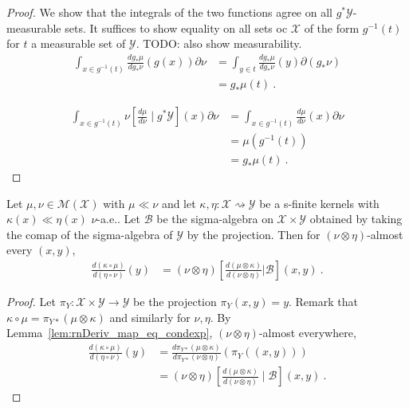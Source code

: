 \begin{proof}%
\uses{}
We show that the integrals of the two functions agree on all $g^* \mathcal Y$-measurable sets. It suffices to show equality on all sets oc $\mathcal X$ of the form $g^{-1}(t)$ for $t$ a measurable set of $\mathcal Y$.
TODO: also show measurability.
\begin{align*}
\int_{x \in g^{-1}(t)}\frac{d g_*\mu}{d g_*\nu}(g(x)) \partial\nu
&= \int_{y \in t}\frac{d g_*\mu}{d g_*\nu}(y) \partial(g_*\nu)
\\
&= g_*\mu (t)
\: .
\end{align*}

\begin{align*}
\int_{x \in g^{-1}(t)}\nu\left[ \frac{d \mu}{d \nu} \mid g^* \mathcal Y\right](x) \partial\nu
&= \int_{x \in g^{-1}(t)}\frac{d \mu}{d \nu}(x) \partial\nu
\\
&= \mu(g^{-1}(t))
\\
&= g_*\mu(t)
\: .
\end{align*}


\end{proof}


\begin{lemma}
  \label{lem:rnDeriv_comp_eq_condexp}
  \uses{}
  Let $\mu, \nu \in \mathcal M(\mathcal X)$ with $\mu \ll \nu$ and let $\kappa, \eta : \mathcal X \rightsquigarrow \mathcal Y$ be a s-finite kernels with $\kappa(x) \ll \eta(x)$ $\nu$-a.e..
  Let $\mathcal B$ be the sigma-algebra on $\mathcal X \times \mathcal Y$ obtained by taking the comap of the sigma-algebra of $\mathcal Y$ by the projection.
  Then for $(\nu \otimes \eta)$-almost every $(x,y)$,
  \begin{align*}
  \frac{d(\kappa \circ \mu)}{d(\eta \circ \nu)}(y)
  &= (\nu \otimes \eta)\left[ \frac{d (\mu \otimes \kappa)}{d (\nu \otimes \eta)} \Big| \mathcal B \right](x,y)
  \: .
  \end{align*}
\end{lemma}

\begin{proof}%
{}
Let $\pi_Y : \mathcal X \times \mathcal Y \to \mathcal Y$ be the projection $\pi_Y(x,y) = y$.
Remark that $\kappa \circ \mu = \pi_{Y*}(\mu \otimes \kappa)$ and similarly for $\nu, \eta$.
By Lemma~\ref{lem:rnDeriv_map_eq_condexp}, $(\nu \otimes \eta)$-almost everywhere,
\begin{align*}
\frac{d(\kappa \circ \mu)}{d(\eta \circ \nu)}(y)
&= \frac{d \pi_{Y*}(\mu \otimes \kappa)}{d \pi_{Y*}(\nu \otimes \eta)}(\pi_Y((x,y)))
\\
&= (\nu \otimes \eta)\left[ \frac{d (\mu \otimes \kappa)}{d (\nu \otimes \eta)} \mid \mathcal B\right](x,y)
\: .
\end{align*}
\end{proof}


